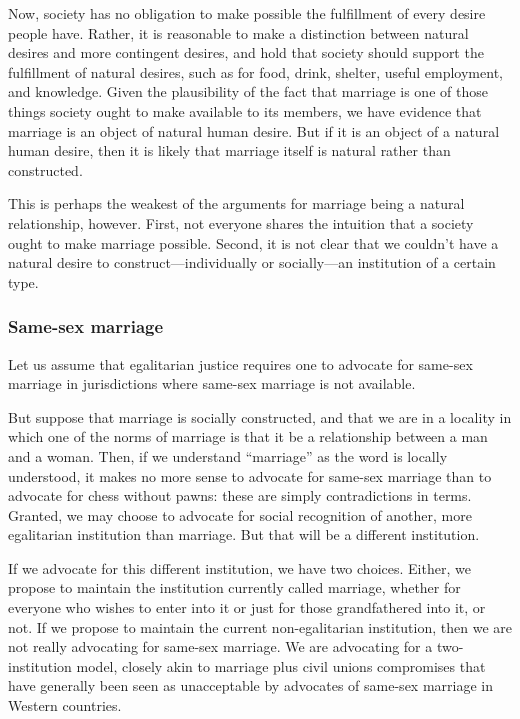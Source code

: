 Now, society has no obligation to make possible the fulfillment of every desire people have. Rather, it is reasonable to make a distinction between natural
desires and more contingent desires, and hold that society should support the fulfillment of natural desires, such as for food, drink, shelter, useful
employment, and knowledge. Given the plausibility of the fact that marriage is one of those things society ought to make available to its members, we have evidence that marriage is an object of natural human desire. But if it is an object of a natural human desire, then it is likely that marriage itself is natural rather than
constructed.

This is perhaps the weakest of the arguments for marriage being a natural relationship, however. First, not everyone shares the intuition that a society ought
to make marriage possible. Second, it is not clear that we couldn't have a natural desire to construct---individually or socially---an institution of a certain
type.

\subsubsection{Same-sex marriage}
Let us assume that egalitarian justice requires one to advocate for same-sex marriage in jurisdictions where same-sex marriage is not available.

But suppose that marriage is socially constructed, and that we are in a locality in which one of the norms of marriage is that it be a relationship
between a man and a woman. Then, if we understand ``marriage'' as the word is locally understood, it makes no more sense to advocate for same-sex marriage
than to advocate for chess without pawns: these are simply contradictions in terms. Granted, we may choose to advocate for social recognition of another,
more egalitarian institution than marriage. But that will be a different institution.

If we advocate for this different institution, we have two choices. Either, we propose to maintain the institution currently called marriage, whether for everyone
who wishes to enter into it or just for those grandfathered into it, or not. If we propose to maintain the current non-egalitarian institution, then we are not
really advocating for same-sex marriage. We are advocating for a two-institution model, closely akin to marriage plus civil unions compromises that have generally been
seen as unacceptable by advocates of same-sex marriage in Western countries.


